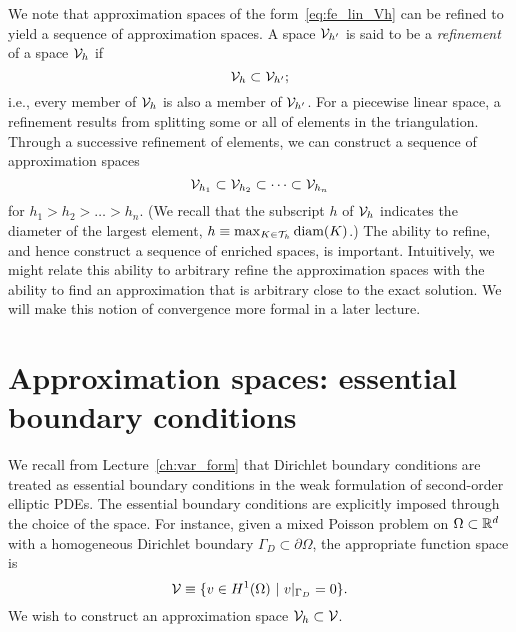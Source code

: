 We note that approximation spaces of the form~\eqref{eq:fe_lin_Vh} can be refined to yield a sequence of approximation spaces. A space $\mathcal{V}_{h'}$ is said to be a \emph{refinement} of a space $\mathcal{V}_h$ if
\begin{equation*}
  \mathcal{V}_h \subset \mathcal{V}_{h'};
\end{equation*}
i.e., every member of $\mathcal{V}_h$ is also a member of $\mathcal{V}_{h'}$. For a piecewise linear space, a refinement results from splitting some or all of elements in the triangulation.  Through a successive refinement of elements, we can construct a sequence of approximation spaces
\begin{equation*}
  \mathcal{V}_{h_1} \subset \mathcal{V}_{h_2} \subset \cdots \subset \mathcal{V}_{h_n}
\end{equation*}
for $h_1 > h_2 > \dots > h_n$. (We recall that the subscript $h$ of $\mathcal{V}_h$ indicates the diameter of the largest element, $h \equiv \max_{K \in \mathcal{T}_h} \text{diam}(K)$.)  The ability to refine, and hence construct a sequence of enriched spaces, is important. Intuitively, we might relate this ability to arbitrary refine the approximation spaces with the ability to find an approximation that is arbitrary close to the exact solution.  We will make this notion of convergence more formal in a later lecture.

\section{Approximation spaces: essential boundary conditions}
\label{sec:fe_form_essential_bc}
We recall from Lecture~\ref{ch:var_form} that Dirichlet boundary conditions are treated as essential boundary conditions in the weak formulation of second-order elliptic PDEs.  The essential boundary conditions are explicitly imposed through the choice of the space.  For instance, given a mixed Poisson problem on $\Omega \subset \mathbb{R}^d$ with a homogeneous Dirichlet boundary $\Gamma_D \subset \partial \Omega$, the appropriate function space is
\begin{equation*}
  \mathcal{V} \equiv \{ v \in H^1(\Omega) \ | \ v|_{\Gamma_D} = 0 \}.
\end{equation*}
We wish to construct an approximation space $\mathcal{V}_h \subset \mathcal{V}$.


